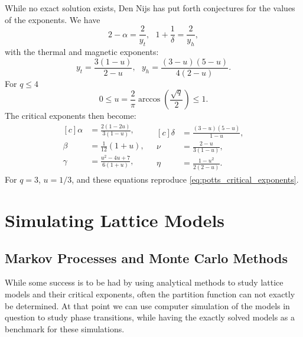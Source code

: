 \documentclass[11pt, a4paper]{report} %
\begin{document}
While no exact solution exists, Den Nijs has put forth conjectures for the values of the exponents.\cite{nijs:1979}
We have\cite{wu:1982}
\begin{equation}
	2 - \alpha = \frac{2}{y_t} ,\ \ \ 1 + \frac{1}{\delta} = \frac{2}{y_h},
\end{equation}
with the thermal and magnetic exponents:
\begin{equation}
	y_t = \frac{3(1-u)}{2-u},\ \ \ y_h = \frac{(3-u)(5-u)}{4(2-u)}.
\end{equation}
For \(q \leq 4\)\cite{wu:1982}
\begin{equation}
	0 \leq u = \frac{2}{\pi} \arccos(\frac{\sqrt{q}}{2}) \leq 1.
\end{equation}
The critical exponents then become\cite{wu:1982, baxter:1989}:
\begin{equation}
	\begin{aligned}[c]
		\alpha &= \frac{2(1-2u)}{3(1-u)}, \\
		\beta &= \frac{1}{12}(1 + u), \\
		\gamma &= \frac{u^2 -4u +7}{6(1+u)}, \\
	\end{aligned}
	\ \ \
	\begin{aligned}[c]
		\delta &= \frac{(3-u)(5-u)}{1-u}, \\
		\nu &= \frac{2-u}{3(1-u)}, \\
		\eta &= \frac{1-u^2}{2(2-u)}.
	\end{aligned}
\end{equation}
For \(q=3\), \(u=1/3\), and these equations reproduce \cref{eq:potts_critical_exponents}.


\chapter{Simulating Lattice Models}

\section{Markov Processes and Monte Carlo Methods}
While some success is to be had by using analytical methods to study lattice models and their critical exponents, often the partition function can not exactly be determined.
At that point we can use computer simulation of the models in question to study phase transitions, while having the exactly solved models as a benchmark for these simulations.
\end{document}
